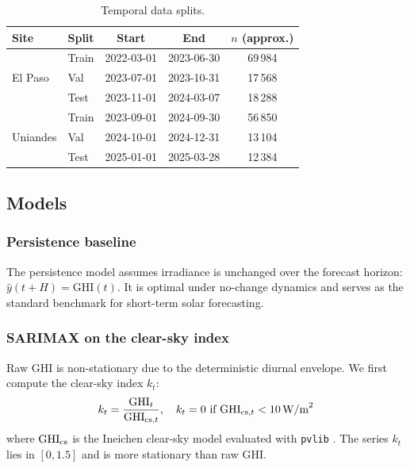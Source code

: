 \begin{table}[t]
  \centering
  \caption{Temporal data splits.}
  \label{tab:splits}
  \setlength{\tabcolsep}{4pt}
  \begin{tabular}{llccc}
    \toprule
    \textbf{Site} & \textbf{Split} & \textbf{Start} & \textbf{End} & $n$ (approx.) \\
    \midrule
    \multirow{3}{*}{El Paso}
      & Train & 2022-03-01 & 2023-06-30 & 69\,984 \\
      & Val   & 2023-07-01 & 2023-10-31 & 17\,568 \\
      & Test  & 2023-11-01 & 2024-03-07 & 18\,288 \\
    \midrule
    \multirow{3}{*}{Uniandes}
      & Train & 2023-09-01 & 2024-09-30 & 56\,850 \\
      & Val   & 2024-10-01 & 2024-12-31 & 13\,104 \\
      & Test  & 2025-01-01 & 2025-03-28 & 12\,384 \\
    \bottomrule
  \end{tabular}
\end{table}

\subsection{Models}

\subsubsection{Persistence baseline}

The persistence model assumes irradiance is unchanged over the forecast horizon:
$\hat{y}(t+H) = \text{GHI}(t)$. It is optimal under no-change dynamics and
serves as the standard benchmark for short-term solar forecasting.

\subsubsection{SARIMAX on the clear-sky index}
\label{ssec:sarima}

Raw GHI is non-stationary due to the deterministic diurnal envelope. We first
compute the clear-sky index $k_t$:
\begin{equation}
  k_t = \frac{\text{GHI}_t}{\text{GHI}_{\text{cs},t}}, \quad
  k_t = 0 \text{ if } \text{GHI}_{\text{cs},t} < 10\,\text{W/m}^2
  \label{eq:csi}
\end{equation}
where $\text{GHI}_{\text{cs}}$ is the Ineichen clear-sky model \cite{ineichen2002} evaluated with
\texttt{pvlib} \cite{holmgren2018}. The series $k_t$ lies in $[0, 1.5]$ and is
more stationary than raw GHI.

